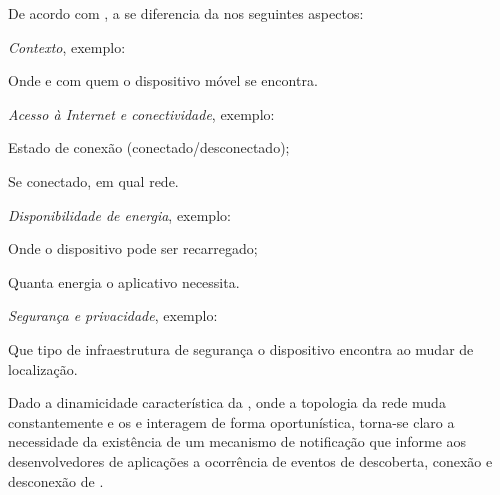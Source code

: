 De acordo com , a \iomt{} se diferencia da \iot{} nos seguintes aspectos:
\begin{alineas}

	\item \emph{Contexto}, exemplo:
		
		\begin{alineas}

			\item Onde e com quem o dispositivo móvel se encontra.

		\end{alineas}

	\item \emph{Acesso à Internet e conectividade}, exemplo:
		
		\begin{alineas}

			\item Estado de conexão (conectado/desconectado);
				
			\item Se conectado, em qual rede.

		\end{alineas}

	\item \emph{Disponibilidade de energia}, exemplo:
		
		\begin{alineas}

			\item Onde o dispositivo pode ser recarregado;
				
			\item Quanta energia o aplicativo necessita.

		\end{alineas}

	\item \emph{Segurança e privacidade}, exemplo:
		
		\begin{alineas}

			\item Que tipo de infraestrutura de segurança o dispositivo encontra ao mudar de localização.

		\end{alineas}

\end{alineas}



Dado a dinamicidade característica da \iomt{}, onde a topologia da rede muda constantemente e os \smartobjs{} e \gateways{} interagem de forma oportunística, torna-se claro a necessidade da existência de um mecanismo de notificação que informe aos desenvolvedores de aplicações a ocorrência de eventos de descoberta, conexão e desconexão de \smartobjs{}.

